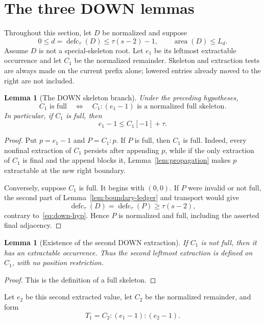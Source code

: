 \documentclass[11pt]{article}
\newtheorem{lemma}[theorem]{Lemma}
\theoremstyle{definition}
\theoremstyle{remark}
\newcommand{\area}{\operatorname{area}}
\newcommand{\defc}{\operatorname{defc}}
\begin{document}
\section{The three DOWN lemmas}

Throughout this section, let $D$ be normalized and suppose
\begin{equation}
  0\le d=\defc_\tau(D)\le\tau(s-2)-1,
  \qquad \area(D)\le L_d.
  \label{eq:down-hyp}
\end{equation}
Assume $D$ is not a special-skeleton root.  Let $e_1$ be its leftmost
extractable occurrence and let $C_1$ be the normalized remainder.  Skeleton
and extraction tests are always made on the current prefix alone; lowered
entries already moved to the right are not included.

\begin{lemma}[The DOWN skeleton branch]
\label{lem:down-skeleton}
Under the preceding hypotheses,
\[
  C_1\text{ is full}
  \quad\Longleftrightarrow\quad
  C_1:(e_1-1)\text{ is a normalized full skeleton}.
\]
In particular, if $C_1$ is full, then
\[
  e_1-1\le C_1[-1]+\tau.
\]
\end{lemma}

\begin{proof}
Put $p=e_1-1$ and $P=C_1:p$.  If $P$ is full, then $C_1$ is full.  Indeed,
every nonfinal extraction of $C_1$ persists after appending $p$, while if
the only extraction of $C_1$ is final and the append blocks it,
Lemma~\ref{lem:propagation} makes $p$ extractable at the new right boundary.

Conversely, suppose $C_1$ is full.  It begins with $(0,0)$.  If $P$ were
invalid or not full, the second part of Lemma~\ref{lem:boundary-ledger} and
transport would give
\[
  \defc_\tau(D)=\defc_\tau(P)\ge\tau(s-2),
\]
contrary to~\eqref{eq:down-hyp}.  Hence $P$ is normalized and full, including
the asserted final adjacency.
\end{proof}

\begin{lemma}[Existence of the second DOWN extraction]
\label{lem:down-second}
If $C_1$ is not full, then it has an extractable occurrence.  Thus the second
leftmost extraction is defined on $C_1$, with no position restriction.
\end{lemma}

\begin{proof}
This is the definition of a full skeleton.
\end{proof}

Let $e_2$ be this second extracted value, let $C_2$ be the normalized
remainder, and form
\[
  T_1=C_2:(e_1-1):(e_2-1).
\]
\end{document}
